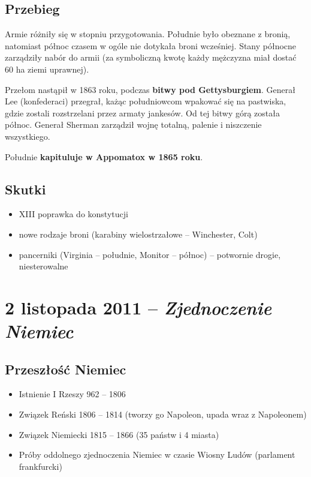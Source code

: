 \documentclass [a4paper, 11pt, oneside]{book}
\begin{document}
    \section{Przebieg} %
    \label{sec:przebieg}
        Armie różniły się w stopniu przygotowania. Południe było obeznane z bronią, natomiast północ czasem w ogóle nie dotykała broni wcześniej. Stany północne zarządziły nabór do armii (za symboliczną kwotę każdy mężczyzna miał dostać 60 ha ziemi uprawnej).

        Przełom nastąpił w 1863 roku, podczas \textbf{bitwy pod Gettysburgiem}. Generał Lee (konfederaci) przegrał, każąc południowcom wpakować się na pastwiska, gdzie zostali rozstrzelani przez armaty jankesów. Od tej bitwy górą została północ. Generał Sherman zarządził wojnę totalną, palenie i niszczenie wszystkiego.

        Południe \textbf{kapituluje w Appomatox w 1865 roku}.
    \section{Skutki} %
    \label{sec:skutki}
        \begin{itemize}
            \item XIII poprawka do konstytucji
            \item nowe rodzaje broni (karabiny wielostrzałowe -- Winchester, Colt)
            \item pancerniki (Virginia -- południe, Monitor -- północ) -- potwornie drogie, niesterowalne
        \end{itemize}
\chapter{2 listopada 2011 -- \textit{Zjednoczenie Niemiec}} %
\label{cha:2_listopada_2011_textit}
    \section{Przeszłość Niemiec} %
    \label{sec:przesz_o_niemiec}
        \begin{itemize}
            \item Istnienie I Rzeszy 962 -- 1806
            \item Związek Reński 1806 -- 1814 (tworzy go Napoleon, upada wraz z Napoleonem)
            \item Związek Niemiecki 1815 -- 1866 (35 państw i 4 miasta)
            \item Próby oddolnego zjednoczenia Niemiec w czasie Wiosny Ludów (parlament frankfurcki)
        \end{itemize}
\end{document}
